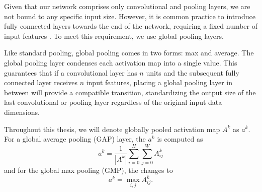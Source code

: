 Given that our network comprises only convolutional and pooling layers, we are not bound to any specific input size.
However, it is common practice to introduce fully connected layers towards the end of the network, requiring a fixed number of input features \cite{cnns}.
To meet this requirement, we use global pooling layers.

Like standard pooling, global pooling comes in two forms: max and average.
The global pooling layer condenses each activation map into a single value.
This guarantees that if a convolutional layer has $n$ units and the subsequent fully connected layer receives $n$ input features, placing a global pooling layer in between will provide a compatible transition, standardizing the output size of the last convolutional or pooling layer regardless of the original input data dimensions.

Throughout this thesis, we will denote globally pooled activation map $A^k$ as $a^k$. For a global average pooling (GAP) layer, the $a^k$ is computed as
\begin{equation}\label{gap}
    a^k = \frac{1}{|A^k|} \sum_{i=0}^H \sum_{j=0}^W A^k_{ij}
\end{equation}
and for the global max pooling (GMP), the  changes to
\begin{equation}
    a^k = \max_{i,j} A^k_{ij}.
\end{equation}
